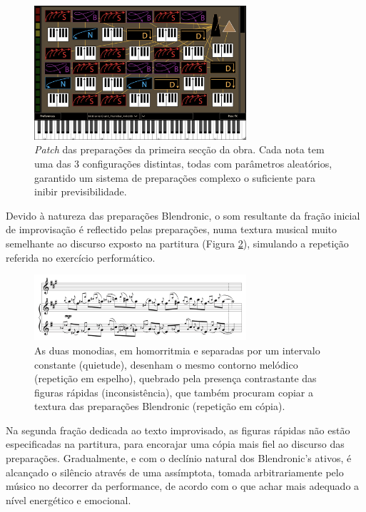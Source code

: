 \documentclass[../main.tex]{subfiles}
\begin{document}
\begin{figure}[h]
    \centering
    \captionsetup{width=0.8\textwidth}
    \includegraphics[width=0.7\textwidth]{images/bit1.png}
    \caption{\textsl{Patch} das preparações da primeira secção da obra. Cada nota tem uma das 3 configurações distintas, todas com parâmetros aleatórios, garantido um sistema de preparações complexo o suficiente para inibir previsibilidade.}
    \label{fig:bit1}
\end{figure}

Devido à natureza das preparações Blendronic, o som resultante da fração inicial de improvisação é reflectido pelas preparações, numa textura musical muito semelhante ao discurso exposto na partitura (Figura \ref{fig:obra1}), simulando a repetição referida no exercício performático.

\begin{figure}[h]
    \centering
    \captionsetup{width=0.8\textwidth}
    \includegraphics[width=0.7\textwidth]{images/obra1.png}
    \caption{As duas monodias, em homorritmia e separadas por um intervalo constante (quietude), desenham o mesmo contorno melódico (repetição em espelho), quebrado pela presença contrastante das figuras rápidas (inconsistência), que também procuram copiar a textura das preparações Blendronic (repetição em cópia).}
    \label{fig:obra1}
\end{figure}

Na segunda fração dedicada ao texto improvisado, as figuras rápidas não estão especificadas na partitura, para encorajar uma cópia mais fiel ao discurso das preparações. Gradualmente, e com o declínio natural dos Blendronic's ativos, é alcançado o silêncio através de uma assímptota, tomada arbitrariamente pelo músico no decorrer da performance, de acordo com o que achar mais adequado a nível energético e emocional.
\end{document}
